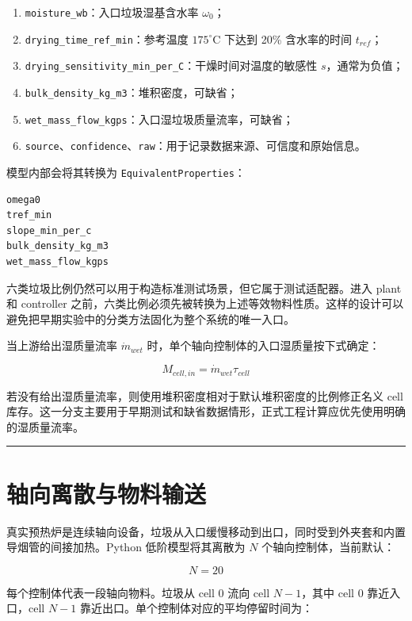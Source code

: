 \documentclass[UTF8,openany,zihao=-4,oneside]{ctexbook}
\providecommand{\passthrough}[1]{#1}
\newcommand{\manualdivider}{\par\vspace{0.6em}\noindent\textcolor{FGLine}{\rule{\linewidth}{0.7pt}}\vspace{0.6em}\par}
\begin{document}
\begin{enumerate}
\item \passthrough{\lstinline!moisture_wb!}：入口垃圾湿基含水率 \(\omega_0\)；
\item \passthrough{\lstinline!drying_time_ref_min!}：参考温度 \(175^\circ\mathrm{C}\) 下达到 20\% 含水率的时间 \(t_{ref}\)；
\item \passthrough{\lstinline!drying_sensitivity_min_per_C!}：干燥时间对温度的敏感性 \(s\)，通常为负值；
\item \passthrough{\lstinline!bulk_density_kg_m3!}：堆积密度，可缺省；
\item \passthrough{\lstinline!wet_mass_flow_kgps!}：入口湿垃圾质量流率，可缺省；
\item \passthrough{\lstinline!source!}、\passthrough{\lstinline!confidence!}、\passthrough{\lstinline!raw!}：用于记录数据来源、可信度和原始信息。
\end{enumerate}

模型内部会将其转换为 \passthrough{\lstinline!EquivalentProperties!}：

\begin{lstlisting}
omega0
tref_min
slope_min_per_c
bulk_density_kg_m3
wet_mass_flow_kgps
\end{lstlisting}

六类垃圾比例仍然可以用于构造标准测试场景，但它属于测试适配器。进入 plant 和 controller 之前，六类比例必须先被转换为上述等效物料性质。这样的设计可以避免把早期实验中的分类方法固化为整个系统的唯一入口。

当上游给出湿质量流率 \(\dot m_{wet}\) 时，单个轴向控制体的入口湿质量按下式确定：

\[
M_{cell,in}=\dot m_{wet}\tau_{cell}
\]

若没有给出湿质量流率，则使用堆积密度相对于默认堆积密度的比例修正名义 cell 库存。这一分支主要用于早期测试和缺省数据情形，正式工程计算应优先使用明确的湿质量流率。

\manualdivider

\section{轴向离散与物料输送}\label{ux8f74ux5411ux79bbux6563ux4e0eux7269ux6599ux8f93ux9001}

真实预热炉是连续轴向设备，垃圾从入口缓慢移动到出口，同时受到外夹套和内置导烟管的间接加热。Python 低阶模型将其离散为 \(N\) 个轴向控制体，当前默认：

\[
N=20
\]

每个控制体代表一段轴向物料。垃圾从 cell 0 流向 cell \(N-1\)，其中 cell 0 靠近入口，cell \(N-1\) 靠近出口。单个控制体对应的平均停留时间为：
\end{document}
